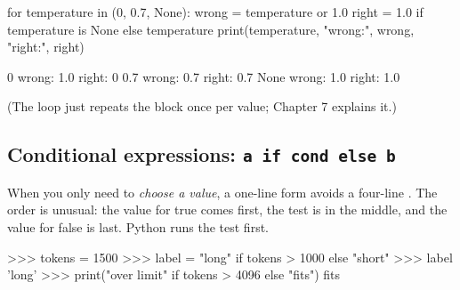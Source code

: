 \begin{pycode}
for temperature in (0, 0.7, None):
    wrong = temperature or 1.0
    right = 1.0 if temperature is None else temperature
    print(temperature, "wrong:", wrong, "right:", right)
\end{pycode}
\begin{rawcode}
0 wrong: 1.0 right: 0
0.7 wrong: 0.7 right: 0.7
None wrong: 1.0 right: 1.0
\end{rawcode}

(The  loop just repeats the block once per value; Chapter 7 explains it.)

\subsection{Conditional expressions: \texttt{a if cond else b}}

When you only need to \emph{choose a value}, a one-line form avoids a four-line . The order is
unusual: the value for true comes first, the test is in the middle, and the value for false is last.
Python runs the test first.

\begin{center}
\end{center}

\begin{pycode}
>>> tokens = 1500
>>> label = "long" if tokens > 1000 else "short"
>>> label
'long'
>>> print("over limit" if tokens > 4096 else "fits")
fits
\end{pycode}

